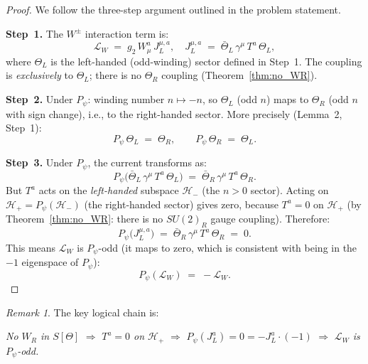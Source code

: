 \documentclass[12pt,a4paper]{article}
\theoremstyle{definition}
\theoremstyle{remark}
\newtheorem{remark}[theorem]{Remark}
\begin{document}
\begin{proof}
We follow the three-step argument outlined in the problem statement.

\textbf{Step~1.} The $W^\pm$ interaction term is:
\begin{equation}
  \mathcal{L}_{W} \;=\; g_2\,W^a_\mu\,J^{\mu,a}_L,
  \quad
  J^{\mu,a}_L \;=\; \bar{\Theta}_L\,\gamma^\mu\,T^a\,\Theta_L,
\end{equation}
where $\Theta_L$ is the left-handed (odd-winding) sector defined in
Step~1.  The coupling is \emph{exclusively} to $\Theta_L$; there is
no $\Theta_R$ coupling (Theorem~\ref{thm:no_WR}).

\textbf{Step~2.} Under $P_\psi$: winding number $n \mapsto -n$,
so $\Theta_L$ (odd $n$) maps to $\Theta_R$ (odd $n$ with sign change),
i.e., to the right-handed sector.  More precisely (Lemma~2, Step~1):
\begin{equation}
  P_\psi\,\Theta_L \;=\; \Theta_R, \qquad
  P_\psi\,\Theta_R \;=\; \Theta_L.
\end{equation}

\textbf{Step~3.} Under $P_\psi$, the current transforms as:
\begin{equation}
  P_\psi\bigl(\bar{\Theta}_L\,\gamma^\mu\,T^a\,\Theta_L\bigr)
  \;=\; \bar{\Theta}_R\,\gamma^\mu\,T^a\,\Theta_R.
\end{equation}
But $T^a$ acts on the \emph{left-handed} subspace $\mathcal{H}_-$
(the $n > 0$ sector).  Acting on $\mathcal{H}_+ = P_\psi(\mathcal{H}_-)$
(the right-handed sector) gives zero, because $T^a = 0$ on $\mathcal{H}_+$
(by Theorem~\ref{thm:no_WR}: there is no $SU(2)_R$ gauge coupling).
Therefore:
\begin{equation}
  P_\psi\bigl(J^{\mu,a}_L\bigr)
  \;=\; \bar{\Theta}_R\,\gamma^\mu\,T^a\,\Theta_R
  \;=\; 0.
\end{equation}
This means $\mathcal{L}_W$ is $P_\psi$-odd (it maps to zero, which is
consistent with being in the $-1$ eigenspace of $P_\psi$):
\begin{equation}
  P_\psi(\mathcal{L}_W) \;=\; -\mathcal{L}_W.
\end{equation}
\end{proof}

\begin{remark}
The key logical chain is:
\begin{center}
\textit{No $W_R$ in $S[\Theta]$}
$\Longrightarrow$
\textit{$T^a = 0$ on $\mathcal{H}_+$}
$\Longrightarrow$
\textit{$P_\psi(J_L^a) = 0 = -J_L^a \cdot (-1)$}
$\Longrightarrow$
\textit{$\mathcal{L}_W$ is $P_\psi$-odd.}
\end{center}
\end{remark}
\end{document}

